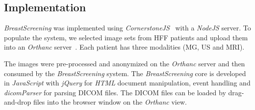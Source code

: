 \subsection{Implementation}

\textit{BreastScreening} was implemented using \textit{CornerstoneJS}~\cite{urban2017lesiontracker} with a \textit{NodeJS} server.
To populate the system, we selected image sets from HFF patients and upload them into an \textit{Orthanc} server~\cite{Jodogne2018}.
Each patient has three modalities (MG, US and MRI).

The images were pre-processed and anonymized on the \textit{Orthanc} server and then consumed by the \textit{BreastScreening} system.
The \textit{BreastScreening} core is developed in \textit{JavaScript} with \textit{jQuery} for \textit{HTML} document manipulation, event handling and \textit{dicomParser} for parsing DICOM files.
The DICOM files can be loaded by drag-and-drop files into the browser window on the \textit{Orthanc} view.